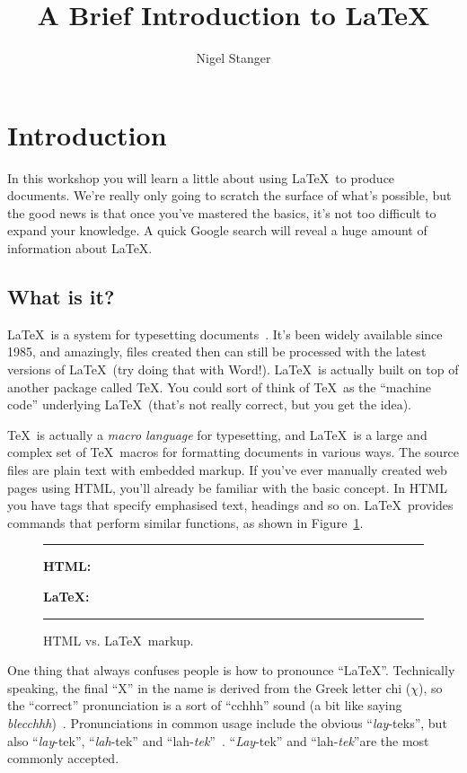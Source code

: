 \documentclass[12pt,a4paper,pdftex]{article}
\title{A Brief Introduction to \LaTeX}
\author{Nigel Stanger}
\begin{document}
\maketitle


\section{Introduction}
\label{sec-intro}

In this workshop you will learn a little about using \LaTeX\ to produce documents. We're really only going to scratch the surface of what's possible, but the good news is that once you've mastered the basics, it's not too difficult to expand your knowledge. A quick Google search will reveal a huge amount of information about \LaTeX.


\subsection{What is it?}
\label{sec-what}

\LaTeX\ is a system for typesetting documents~\cite{UsersGuide}. It's been widely available since 1985, and amazingly, files created then can still be processed with the latest versions of \LaTeX\ (try doing that with Word!). \LaTeX\ is actually built on top of another package called \TeX. You could sort of think of \TeX\ as the ``machine code'' underlying \LaTeX\ (that's not really correct, but you get the idea).

\TeX\ is actually a \emph{macro language} for typesetting, and \LaTeX\ is a large and complex set of \TeX\ macros for formatting documents in various ways. The source files are plain text with embedded markup. If you've ever manually created web pages using HTML, you'll already be familiar with the basic concept. In HTML you have tags that specify emphasised text, headings and so on. \LaTeX\ provides commands that perform similar functions, as shown in Figure~\ref{fig-HTMLcomparison}.

\begin{figure}
	\hrule\medskip
	\textbf{HTML:}

	\bigskip
	
	\textbf{\LaTeX:}

	\hrule
	\caption{HTML vs. \LaTeX\ markup.}
	\label{fig-HTMLcomparison}
\end{figure}

One thing that always confuses people is how to pronounce ``\LaTeX''. Technically speaking, the final ``X'' in the name is derived from the Greek letter chi ($\chi$), so the ``correct'' pronunciation is a sort of ``cchhh'' sound (a bit like saying \emph{blecchhh})~\cite{TeXBook}. Pronunciations in common usage include the obvious ``\emph{lay}-teks'', but also ``\emph{lay}-tek'', ``\emph{lah}-tek'' and ``lah-\emph{tek}''~\cite{UsersGuide}. ``\emph{Lay}-tek''  and ``lah-\emph{tek}''are the most commonly accepted.
\end{document}
